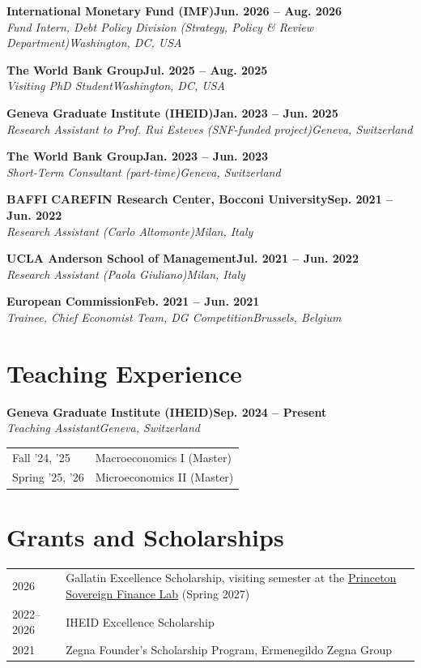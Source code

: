 \documentclass[letterpaper,11pt]{article}
\makeatletter
\newcommand{\cventry}[4]{%
    \textbf{#1}\hfill\textbf{#2}\\
    {\small\textit{#3}}\hfill{\small\textit{#4}}\par\vspace{5pt}}
\newenvironment{rows}{%
    \begin{tabular}{@{}p{2.8cm}p{\dimexpr\textwidth-2.8cm-2\tabcolsep}@{}}}%
    {\end{tabular}}
\makeatother
\begin{document}
\cventry{International Monetary Fund (IMF)}{Jun. 2026 -- Aug. 2026}{Fund Intern, Debt Policy Division (Strategy, Policy \& Review Department)}{Washington, DC, USA}

\cventry{The World Bank Group}{Jul. 2025 -- Aug. 2025}{Visiting PhD Student}{Washington, DC, USA}

\cventry{Geneva Graduate Institute (IHEID)}{Jan. 2023 -- Jun. 2025}{Research Assistant to Prof. Rui Esteves (SNF-funded project)}{Geneva, Switzerland}

\cventry{The World Bank Group}{Jan. 2023 -- Jun. 2023}{Short-Term Consultant (part-time)}{Geneva, Switzerland}

\cventry{BAFFI CAREFIN Research Center, Bocconi University}{Sep. 2021 -- Jun. 2022}{Research Assistant (Carlo Altomonte)}{Milan, Italy}

\cventry{UCLA Anderson School of Management}{Jul. 2021 -- Jun. 2022}{Research Assistant (Paola Giuliano)}{Milan, Italy}

\cventry{European Commission}{Feb. 2021 -- Jun. 2021}{Trainee, Chief Economist Team, DG Competition}{Brussels, Belgium}

\section*{Teaching Experience}

\cventry{Geneva Graduate Institute (IHEID)}{Sep. 2024 -- Present}{Teaching Assistant}{Geneva, Switzerland}
\vspace{-2pt}
\begin{rows}
Fall '24, '25   & Macroeconomics I (Master)\\[2pt]
Spring '25, '26 & Microeconomics II (Master)
\end{rows}

\section*{Grants and Scholarships}

\begin{rows}
2026       & Gallatin Excellence Scholarship, visiting semester at the \href{https://psfl.princeton.edu/}{Princeton Sovereign Finance Lab} (Spring 2027)\\[3pt]
2022--2026 & IHEID Excellence Scholarship\\[3pt]
2021       & Zegna Founder's Scholarship Program, Ermenegildo Zegna Group
\end{rows}
\end{document}
